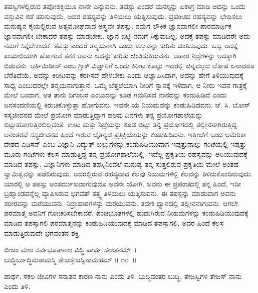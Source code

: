 ತಪಸ್ವಿಗಳಲ್ಲಿರುವ ತಪೋಶಕ್ತಿಯೂ ನಾನೇ ಎನ್ನುವನು. ತಪಸ್ಸು ಎಂದರೆ ಮನಸ್ಸನ್ನು ಏಕಾಗ್ರ ಮಾಡಿ ಅದನ್ನು ಒಂದು ವಸ್ತುವಿನ ಕಡೆ ಹರಿಸುವುದು, ಅದರ ರಹಸ್ಯವನ್ನು ತಿಳಿಯಲು ಯತ್ನಿಸುವುದು. ಪ್ರಪಂಚದ ರಹಸ್ಯವನ್ನು ಭೇದಿಸಲು ಮನುಷ್ಯನ ಕೈಯಲ್ಲಿರುವ ಅತ್ಯಮೋಘವಾದ ಅಸ್ತ್ರವೇ ತಪಸ್ಸು. ನಮಗೆ ಲೌಕಿಕ ಜ್ಞಾನವಾಗಲೀ ಪಾರಮಾರ್ಥಿಕ ಜ್ಞಾನವಾಗಲೀ ಬೇಕಾದರೆ ತಪಸ್ಸು ಮಾಡಬೇಕು. ಜ್ಞಾನ ಬಿಟ್ಟಿ ನಮಗೆ ಸಿಕ್ಕುವುದಿಲ್ಲ. ಅದಕ್ಕೆ ತಪಸ್ಸು ಮಾಡಿದರೇ ಅದು ನಮಗೆ ಸಿಕ್ಕಬೇಕಾದರೆ. ತಪಸ್ಸು ಎಂದರೆ ತನ್ಮಯನಾಗಿ ಒಂದು ವಸ್ತುವನ್ನು ಕುರಿತು ಚಿಂತಿಸುವುದು. ಒಬ್ಬ ಅದಕ್ಕೆ ಖಯಾಲಿಯಾಗಿ ಹೋಗುವ ತನಕ ಅವನು ಅದನ್ನು ಕುರಿತು ಚಿಂತಿಸುತ್ತಿರುವನು. ಆಹಾರ ನಿದ್ರೆಗಳನ್ನು ಅದಕ್ಕಾಗಿ ಬಿಡುವನು. ಆರ್ಕಿಮಿಡೀಸ್ ಎಂಬ ಗ್ರೀಕ್ ವಿಜ್ಞಾನಿಗೆ ಒಂದು ಕಿರೀಟ ಕೊಟ್ಟು ಇದರಲ್ಲಿ ಚಿನ್ನವಲ್ಲದ ಲೋಹ ಏನಾದರೂ ಬೆರೆತಿದೆಯೆ, ಅದನ್ನು ಕಿರೀಟವನ್ನು ಕರಗಿಸದೆ ಹೇಳಬೇಕು ಎಂದು ಆಜ್ಞಾಪಿಸಿದಾಗ, ಅದನ್ನು ಹೇಗೆ ತಿಳಿಯುವುದಕ್ಕೆ ಸಾಧ್ಯ ಎಂಬುದರಲ್ಲೇ ತನ್ಮಯನಾಗುತ್ತಾನೆ. ಒಮ್ಮೆ ಬೆತ್ತಲೆಯಾಗಿ ನೀರಿಗೆ ಸ್ನಾನಕ್ಕೆ ಇಳಿದಾಗ, ಆ ನೀರು ಇವನ ಗಾತ್ರಕ್ಕೆ ಮೇಲೆ ಬಂದಾಗ, ಆತ ತಾನು ದಿಗಂಬರ ಎಂಬುದನ್ನು ಕೂಡ ಗಮನಿಸದೆ ನಾನದನ್ನು ಕಂಡುಹಿಡಿದೆ ಎಂದು ಜನಸಂದಣಿಯಲ್ಲಿ ಕಿರುಚಿಕೊಳ್ಳುತ್ತಾ ಹೋಗುವನು. ಇವನೇ ಯ ನಿಯಮವನ್ನು ಕಂಡುಹಿಡಿದವನು. ಜೆ. ಸಿ. ಬೋಸ್ ಸಸ್ಯಜೀವನದ ಮೇಲೆ ಪ್ರಯೋಗ ಮಾಡುತ್ತಿದ್ದಾಗ ಹಲವು ದಿನಗಳು ತನ್ನ ಪ್ರಯೋಗಶಾಲೆಯನ್ನು ಬಿಟ್ಟುಹೋಗುತ್ತಿರಲಿಲ್ಲವಂತೆ. ಊಟ ಮತ್ತು ನಿದ್ರೆಯನ್ನು ಕೂಡ ಬಿಟ್ಟು ತನ್ನ ಪ್ರಯೋಗದಲ್ಲಿ ತಲ್ಲೀನನಾಗಿರುತ್ತಿದ್ದ. ಅನಂತರವೆ ಸಸ್ಯಜೀವನದ ಹಿಂದೆ ಇರುವ ಚೈತನ್ಯದ ಪ್ರತಿಕ್ರಿಯೆಯನ್ನು ಕಂಡುಹಿಡಿದನು. ಇತ್ತೀಚೆಗೆ ಬಂದ ಅಮೆರಿಕಾ ದೇಶದ ಎಡಿಸನ್ ಎಂಬ ವಿಜ್ಞಾನಿ ವಿದ್ಯುತ್ ಬಲ್ಬುಗಳನ್ನು ಕಂಡುಹಿಡಿಯುವಾಗ ಇಪ್ಪತ್ತುನಾಲ್ಕು ಗಂಟೆಯಲ್ಲಿ ಇಪ್ಪತ್ತು ಮೂರು ಗಂಟೆಗಳು ಕೆಲಸ ಮಾಡುತ್ತಿದ್ದ ತನ್ನ ಪ್ರಯೋಗಶಾಲೆಯಲ್ಲಿ. ಇದೆಲ್ಲ ಪ್ರಕೃತಿಯ ರಹಸ್ಯವನ್ನು ಅರಿಯುವುದಕ್ಕೆ ಮಾಡಿದ ತಪಸ್ಸು. ವಿಜ್ಞಾನಿಗಳು ಮಾಡಿದ ತಪಸ್ಸಿನಿಂದಲೆ ಮನುಷ್ಯ ತನ್ನ ಸುತ್ತಲಿರುವ ಪ್ರಕೃತಿಯ ಮೇಲೆ ಅಂತಹ ಸ್ವಾಮಿತ್ವವನ್ನು ಪಡೆದಿರುವುದು. ಅದರಲ್ಲಿರುವ ರಹಸ್ಯವಾದ ಕೆಲವು ನಿಯಮಗಳಲ್ಲಿ ಕೆಲವನ್ನು ತಿಳಿದುಕೊಂಡಿರುವುದು. ಯಾರಲ್ಲಿ ಆ ತಪಸ್ಸು ಅಂತರ್ಮುಖವಾಗುವುದೊ ಅವನೇ ಯೋಗಿ. ಅವನು ಈ ಪ್ರಪಂಚದಲ್ಲಿ ತನ್ನ ಹಿಂದೆ, ಇಡೀ ಬ್ರಹ್ಮಾಂಡವನ್ನೆಲ್ಲ ವ್ಯಾಪಿಸಿರುವ ಭಗವತ್ ತತ್ತ್ವ ತಿಳಿಯಲು ಯತ್ನಿಸುವನು. ಈ ತಪಸ್ಸನ್ನು ಮಾಡುವಾಗ ಅವನು ಶರೀರವನ್ನು ಮರೆಯುವನು. ನಿದ್ರಾಹಾರಗಳನ್ನು ಮರೆಯುವನು. ತದೇಕ ಧ್ಯಾನದಲ್ಲಿ ತಲ್ಲೀನನಾಗುವನು. ಆಗಲೇ ಪರಮಾತ್ಮ ಅವನಿಗೆ ಗೋಚರಿಸಬೇಕಾದರೆ. ಪಂಚಭೂತಗಳಲ್ಲಿ ಹುದುಗಿರುವ ನಿಯಮಗಳನ್ನು ಕಂಡುಹಿಡಿಯುವುದಕ್ಕೆ ಮಾಡಿದ ತಪಸ್ಸಾಗಲಿ ಪರಮಾತ್ಮನನ್ನು ಕಂಡುಹಿಡಿಯುವುದಕ್ಕೆ ಮಾಡಿದ ತಪಸ್ಸಾಗಲಿ, ಅದರ ಹಿಂದೆ ಕೆಲಸ ಮಾಡುತ್ತಿರುವುದೇ ಭಗವಂತನ ಶಕ್ತಿ.

\begin{shloka}
ಬೀಜಂ ಮಾಂ ಸರ್ವಭೂತಾನಾಂ ವಿದ್ಧಿ ಪಾರ್ಥ ಸನಾತನಮ್~।\\ಬುದ್ಧಿರ್ಬುದ್ಧಿಮತಾಮಸ್ಮಿ ತೇಜಸ್ತೇಜಸ್ವಿನಾಮಹಮ್ \hfill॥ ೧೦~॥
\end{shloka}

\begin{artha}
ಪಾರ್ಥ, ಸಕಲ ಜೀವಿಗಳ ಸನಾತನ ಕಾರಣ ನಾನು ಎಂದು ತಿಳಿ. ಬುದ್ಧಿವಂತರ ಬುದ್ಧಿ, ತೇಜಸ್ವಿಗಳ ತೇಜಸ್ ನಾನು ಎಂದು ತಿಳಿ.
\end{artha}

